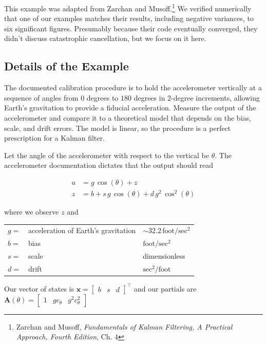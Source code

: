 \documentclass[10pt,oneside,x11names]{article}
\begin{document}
This example was adapted from Zarchan and Musoff.\footnote{Zarchan and Musoff, \emph{Fundamentals of Kalman Filtering, A Practical
Approach, Fourth Edition}, Ch. 4} We verified
numerically that one of our examples matches their results, including negative
variances, to six significant figures. Presumably because their code eventually
converged, they didn't discuss catastrophic cancellation, but we focus on it
here.

\subsection{Details of the Example}
\label{sec:orgheadline23}

The documented calibration procedure is to hold the accelerometer vertically at
a sequence of angles from \(0\) degrees to \(180\) degrees in \(2\)-degree
increments, allowing Earth's gravitation to provide a fiducial acceleration.
Measure the output of the accelerometer and compare it to a theoretical model
that depends on the bias, scale, and drift errors. The model is linear, so the
procedure is a perfect prescription for a Kalman filter.

Let the angle of the accelerometer with respect to the vertical be \(\theta\). The
accelerometer documentation dictates that the output should read

\begin{align}
a &= g \,\cos(\theta) + z \\
\label{eqn:accelerometer-observations}
z &= b + s\, g\, \cos(\theta) + d\, g^2 \,\cos^2(\theta)
\end{align}

\noindent where we observe \(z\) and

\begin{center}
\begin{tabular}{lll}
\(g=\) & acceleration of Earth's gravitation & \(\sim 32.2 \,\textrm{foot}/\textrm{sec}^2\)\\
\(b=\) & bias & \(\textrm{foot} / \textrm{sec}^2\)\\
\(s=\) & scale & dimensionless\\
\(d=\) & drift & \(\textrm{sec}^2 / \textrm{foot}\)\\
\end{tabular}
\end{center}

Our vector of states is
\(\mathbold{x}=\begin{bmatrix}b&s&d\end{bmatrix}^\intercal\) and our partials are
\(\mathbold{A}(\theta)=\begin{bmatrix}1&gc_\theta&g^2c^2_\theta\end{bmatrix}\)
\end{document}
